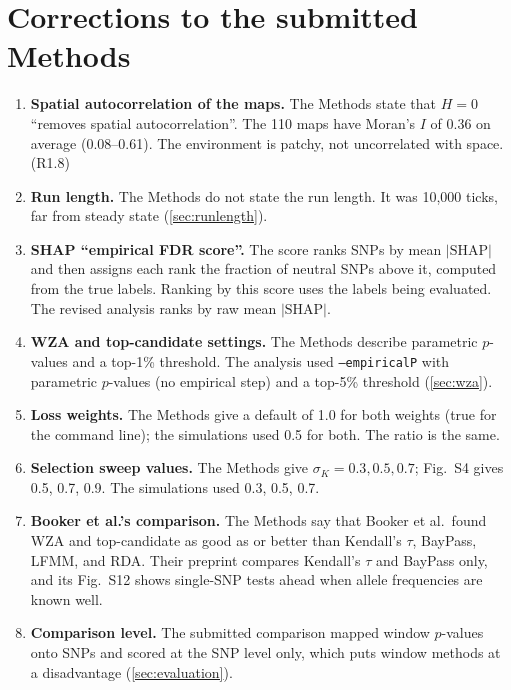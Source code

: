 \section{Corrections to the submitted Methods}
\label{sec:corrections}

\begin{enumerate}
\item \textbf{Spatial autocorrelation of the maps.} The Methods state that
  $H=0$ ``removes spatial autocorrelation''. The 110 maps have Moran's $I$
  of 0.36 on average (0.08--0.61). The environment is patchy, not
  uncorrelated with space. (R1.8)
\item \textbf{Run length.} The Methods do not state the run length. It was
  10,000 ticks, far from steady state (\cref{sec:runlength}).
\item \textbf{SHAP ``empirical FDR score''.} The score ranks SNPs by mean
  $|\text{SHAP}|$ and then assigns each rank the fraction of neutral SNPs
  above it, computed from the true labels. Ranking by this score uses the
  labels being evaluated. The revised analysis ranks by raw mean
  $|\text{SHAP}|$.
\item \textbf{WZA and top-candidate settings.} The Methods describe
  parametric $p$-values and a top-1\% threshold. The analysis used
  \texttt{--empiricalP} with parametric $p$-values (no empirical step) and
  a top-5\% threshold (\cref{sec:wza}).
\item \textbf{Loss weights.} The Methods give a default of 1.0 for both
  weights (true for the \ecolocator command line); the simulations used
  0.5 for both. The ratio is the same.
\item \textbf{Selection sweep values.} The Methods give $\sigma_K = 0.3,
  0.5, 0.7$; Fig.~S4 gives 0.5, 0.7, 0.9. The simulations used 0.3, 0.5,
  0.7.
\item \textbf{Booker et al.'s comparison.} The Methods say that Booker et
  al.\ found WZA and top-candidate as good as or better than Kendall's
  $\tau$, BayPass, LFMM, and RDA. Their preprint compares Kendall's $\tau$
  and BayPass only, and its Fig.~S12 shows single-SNP tests ahead when
  allele frequencies are known well.
\item \textbf{Comparison level.} The submitted comparison mapped window
  $p$-values onto SNPs and scored at the SNP level only, which puts window
  methods at a disadvantage (\cref{sec:evaluation}).
\end{enumerate}


\printbibliography


